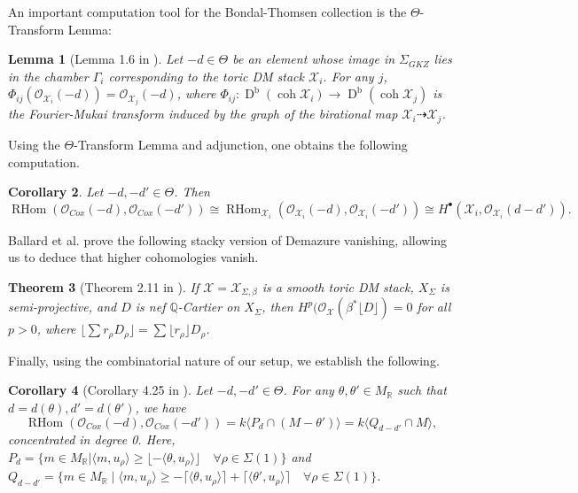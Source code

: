 \documentclass[reqno, 12pt]{amsart}
\newtheorem{theorem}{Theorem}[section]
\newtheorem{lemma}[theorem]{Lemma}
\newtheorem{corollary}[theorem]{Corollary}
\theoremstyle{definition}
\numberwithin{equation}{section}
\newcommand{\dbcoh}[1]{\operatorname{D}^{\operatorname{b}}(\operatorname{coh }#1)}
\newcommand{\R}{\mathbb{R}}
\newcommand{\Q}{\mathbb{Q}}
\def\O{\mathcal{O}}
\newcommand{\Rhom}{\operatorname{RHom}}
\begin{document}
An important computation tool for the Bondal-Thomsen collection is the $\Theta$-Transform Lemma:
\begin{lemma}[Lemma 1.6 in \cite{BBB+}]
    \label{Lem:ThetaTrans}
    Let $-d\in \Theta$ be an element whose image in $\Sigma_{GKZ}$ lies in the chamber $\Gamma_i$ corresponding to the toric DM stack $\mathcal{X}_i$. For any $j$, $\Phi_{ij}(\O_{\mathcal{X}_i}(-d))=\O_{\mathcal{X}_j}(-d)$, where $\Phi_{ij}:\dbcoh{\mathcal{X}_i}\rightarrow\dbcoh{\mathcal{X}_j}$ is the Fourier-Mukai transform induced by the graph of the birational map $\mathcal{X}_i\dashrightarrow \mathcal{X}_j$.
\end{lemma}

Using the $\Theta$-Transform Lemma and adjunction, one obtains the following computation.
\begin{corollary}
    \label{Cor:HomDCox}
    Let $-d,-d'\in \Theta$. Then \[
    \Rhom(\O_{Cox}(-d),\O_{Cox}(-d'))\cong \Rhom_{\mathcal{X}_i}(\O_{\mathcal{X}_i}(-d),\O_{\mathcal{X}_i}(-d'))\cong H^\bullet(\mathcal{X}_i,\O_{\mathcal{X}_i}(d-d')).
    \]
\end{corollary}

Ballard et al. prove the following stacky version of Demazure vanishing, allowing us to deduce that higher cohomologies vanish.
\begin{theorem}[Theorem 2.11 in \cite{BBB+}]
    \label{Thm:StackyDemazure}
    If $\mathcal{X}=\mathcal{X}_{\Sigma,\beta}$ is a smooth toric DM stack, $X_\Sigma$ is semi-projective, and $D$ is nef $\Q$-Cartier on $X_\Sigma$, then $H^p(\O_{\mathcal{X}}(\beta^\ast\lfloor D\rfloor)=0$ for all $p>0$, where $\lfloor \sum r_\rho D_\rho\rfloor=\sum \lfloor r_\rho\rfloor D_\rho$.
\end{theorem}

Finally, using the combinatorial nature of our setup, we establish the following. 

\begin{corollary}[Corollary 4.25 in \cite{BBB+}]
    \label{Cor:HomBT}
    Let $-d,-d'\in \Theta$. For any $\theta,\theta'\in M_\R$ such that $d=d(\theta), d'=d(\theta')$, we have\[
    \Rhom(\O_{Cox}(-d),\O_{Cox}(-d'))=k\langle P_d\cap (M-\theta')\rangle=k\langle Q_{d-d'}\cap M\rangle,
    \]
    concentrated in degree 0. Here, $P_d=\{m\in M_\R\vert \langle m,u_\rho\rangle \geq \lfloor -\langle \theta,u_\rho\rangle\rfloor \quad \forall \rho\in \Sigma(1)\}$ and $Q_{d-d'}=\{m\in M_\R\mid \langle m,u_\rho\rangle\geq-\lceil\langle\theta,u_\rho\rangle\rceil+\lceil\langle\theta',u_\rho\rangle\rceil\quad \forall\rho\in\Sigma(1)\}$.
\end{corollary}
\end{document}
